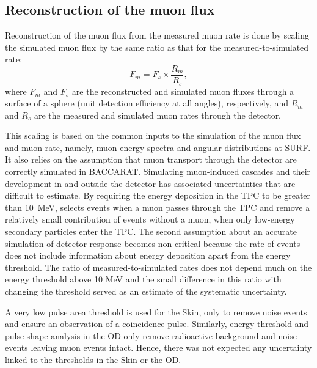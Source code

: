 \subsection{Reconstruction of the muon flux}\label{sec:Muons/MuonFluxReconstruction}
Reconstruction of the muon flux from the measured muon rate is done by scaling the simulated muon flux by the same ratio as that for the measured-to-simulated rate:
\begin{equation}
    F_{m} = F_{s} \times \frac{R_m}{R_s},
\label{eqn:Muons/flux}
\end{equation}
where $F_{m}$ and $F_{s}$ are the reconstructed and simulated muon fluxes through a surface of a sphere (unit detection efficiency at all angles), respectively, and $R_{m}$ and $R_{s}$ are the measured and simulated muon rates through the detector.

This scaling is based on the common inputs to the simulation of the muon flux and muon rate, namely, muon energy spectra and angular distributions at SURF. It also relies on the assumption that muon transport through the detector are correctly simulated in BACCARAT. Simulating muon-induced cascades and their development in and outside the detector has associated uncertainties that are difficult to estimate. By requiring the energy deposition in the TPC to be greater than 10~MeV, selects events when a muon passes through the TPC and remove a relatively small contribution of events without a muon, when only low-energy secondary particles enter the TPC. 
The second assumption about an accurate simulation of detector response becomes non-critical because the rate of events does not include information about energy deposition apart from the energy threshold. The ratio of measured-to-simulated rates does not depend much on the energy threshold above 10 MeV and the small difference in this ratio with changing the threshold served as an estimate of the systematic uncertainty. 

A very low pulse area threshold is used for the Skin, only to remove noise events and ensure an observation of a coincidence pulse. Similarly, energy threshold and pulse shape analysis in the OD only remove radioactive background and noise events leaving muon events intact. Hence, there was not expected any uncertainty linked to the thresholds in the Skin or the OD.

